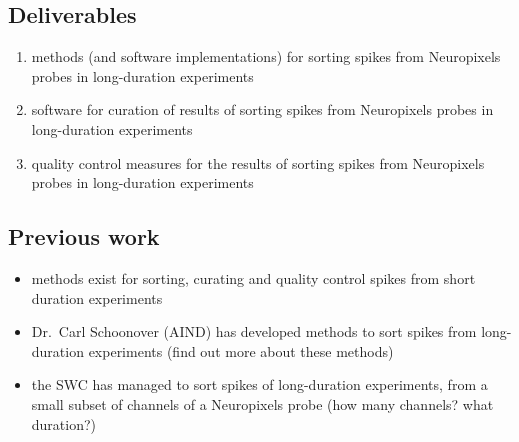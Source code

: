 
\subsection{Deliverables}

\begin{enumerate}

    \item methods (and software implementations) for sorting spikes from
    Neuropixels probes in long-duration experiments

    \item software for curation of results of sorting spikes from Neuropixels
    probes in long-duration experiments

    \item quality control measures for the results of sorting spikes from
    Neuropixels probes in long-duration experiments

\end{enumerate}

\subsection{Previous work}

\begin{itemize}

    \item methods exist for sorting, curating and quality control spikes from
    short duration experiments

    \item Dr.~Carl Schoonover (AIND) has developed methods to sort spikes from
    long-duration experiments (find out more about these methods)

    \item the SWC has managed to sort spikes of long-duration experiments, from
    a small subset of channels of a Neuropixels probe (how many channels?
    what duration?)

\end{itemize}

